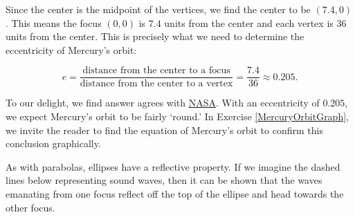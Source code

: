 \documentclass{ximera}
\begin{document}
\begin{example}
\begin{explanation}
\begin{image}
\end{image}

Since the center is the midpoint of the vertices, we find the center to be $(7.4, 0)$.  This means the focus $(0,0)$ is $7.4$ units from the center and each vertex is $36$ units from the center. This is precisely what we need to determine the eccentricity of Mercury's orbit:

\[   e = \frac{\mbox{distance from the center to a focus}}{\mbox{distance from the center to a vertex}}  = \frac{7.4}{36} \approx 0.205. \]

To our delight, we find answer agrees with  \href{http://nssdc.gsfc.nasa.gov/planetary/factsheet/planet_table_british.html}{\underline{NASA}}. With an eccentricity of $0.205$, we expect Mercury's orbit to be fairly `round.'   In Exercise \ref{MercuryOrbitGraph}, we invite the reader to find the equation of Mercury's orbit to confirm this conclusion graphically.  
\end{explanation}
\end{example}

As with parabolas, ellipses have a   reflective property. If we imagine the dashed lines below representing sound waves, then it can be shown that the waves emanating from one focus reflect off the top of the ellipse and head towards the other focus.  
\end{document}
